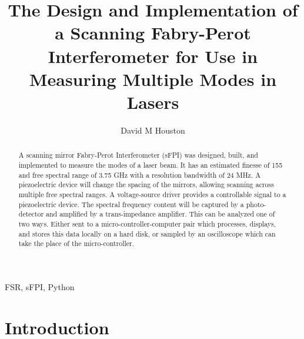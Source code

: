 \documentclass[12pt,journal]{IEEEtran}
\begin{document}
\title{The Design and Implementation of a Scanning Fabry-Perot Interferometer for Use in Measuring Multiple Modes in Lasers}

\author{David M Houston}

\maketitle

\begin{abstract}

A scanning mirror Fabry-Perot Interferometer (sFPI) was designed, built, and implemented to measure the modes of a laser beam. It has an estimated finesse of 155 and free spectral range of 3.75 GHz with a resolution bandwidth of 24 MHz. A piezoelectric device will change the spacing of the mirrors, allowing scanning across multiple free spectral ranges. A voltage-source driver provides a controllable signal to a piezoelectric device. The spectral frequency content will be captured by a photo-detector and amplified by a trans-impedance amplifier. This can be analyzed one of two ways. Either sent to a micro-controller-computer pair which processes, displays, and stores this data locally on a hard disk, or sampled by an oscilloscope which can take the place of the micro-controller.

\end{abstract}


\begin{IEEEkeywords}
FSR, sFPI, Python
\end{IEEEkeywords}


\section{Introduction} \label{ss:introduction}
\end{document}
